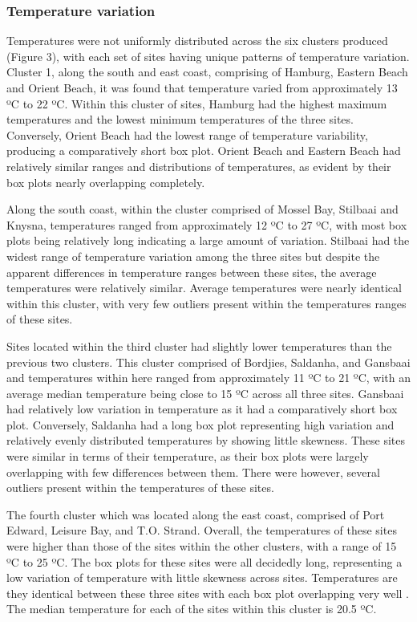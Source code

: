 \documentclass[12pt,a4paper,]{article}
\begin{document}
\hypertarget{temperature-variation}{%
\subsubsection{Temperature variation}\label{temperature-variation}}

Temperatures were not uniformly distributed across the six clusters
produced (Figure 3), with each set of sites having unique patterns of
temperature variation. Cluster 1, along the south and east coast,
comprising of Hamburg, Eastern Beach and Orient Beach, it was found that
temperature varied from approximately 13 ºC to 22 ºC. Within this
cluster of sites, Hamburg had the highest maximum temperatures and the
lowest minimum temperatures of the three sites. Conversely, Orient Beach
had the lowest range of temperature variability, producing a
comparatively short box plot. Orient Beach and Eastern Beach had
relatively similar ranges and distributions of temperatures, as evident
by their box plots nearly overlapping completely.

Along the south coast, within the cluster comprised of Mossel Bay,
Stilbaai and Knysna, temperatures ranged from approximately 12 ºC to 27
ºC, with most box plots being relatively long indicating a large amount
of variation. Stilbaai had the widest range of temperature variation
among the three sites but despite the apparent differences in
temperature ranges between these sites, the average temperatures were
relatively similar. Average temperatures were nearly identical within
this cluster, with very few outliers present within the temperatures
ranges of these sites.

Sites located within the third cluster had slightly lower temperatures
than the previous two clusters. This cluster comprised of Bordjies,
Saldanha, and Gansbaai and temperatures within here ranged from
approximately 11 ºC to 21 ºC, with an average median temperature being
close to 15 ºC across all three sites. Gansbaai had relatively low
variation in temperature as it had a comparatively short box plot.
Conversely, Saldanha had a long box plot representing high variation and
relatively evenly distributed temperatures by showing little skewness.
These sites were similar in terms of their temperature, as their box
plots were largely overlapping with few differences between them. There
were however, several outliers present within the temperatures of these
sites.

The fourth cluster which was located along the east coast, comprised of
Port Edward, Leisure Bay, and T.O. Strand. Overall, the temperatures of
these sites were higher than those of the sites within the other
clusters, with a range of 15 ºC to 25 ºC. The box plots for these sites
were all decidedly long, representing a low variation of temperature
with little skewness across sites. Temperatures are they identical
between these three sites with each box plot overlapping very well . The
median temperature for each of the sites within this cluster is 20.5 ºC.
\end{document}
